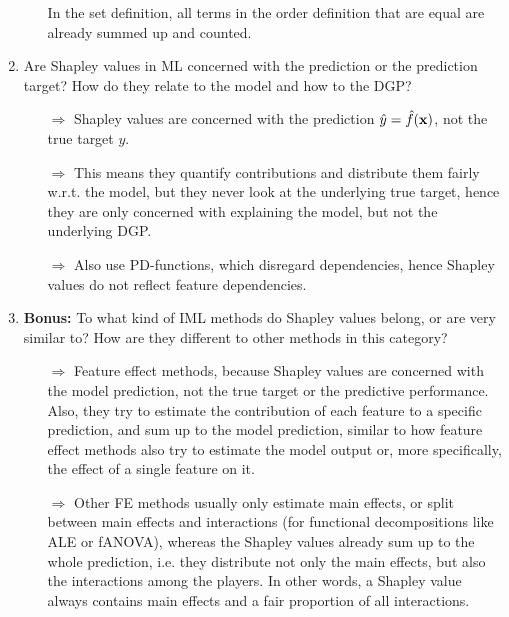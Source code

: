 \begin{enumerate}
\begin{itemize}
        In the set definition, all terms in the order definition that are equal are already summed up and counted.
	\end{itemize}
    \item Are Shapley values in ML concerned with the prediction or the prediction target? How do they relate to the model and how to the DGP?
	\begin{itemize}
		\item[$\Rightarrow$] Shapley values are concerned with the prediction $\hat{y} = \hat{f}(\mathbf{x})$, not the true target $y$.
		\item[$\Rightarrow$] This means they quantify contributions and distribute them fairly w.r.t. the model, but they never look at the underlying true target, hence they are only concerned with explaining the model, but not the underlying DGP.
		\item[$\Rightarrow$] Also use PD-functions, which disregard dependencies, hence Shapley values do not reflect feature dependencies.
	\end{itemize}
    \item \textbf{Bonus:} To what kind of IML methods do Shapley values belong, or are very similar to? How are they different to other methods in this category?
	\begin{itemize}
		\item[$\Rightarrow$] Feature effect methods, because Shapley values are concerned with the model prediction, not the true target or the predictive performance.
        Also, they try to estimate the contribution of each feature to a specific prediction, and sum up to the model prediction, similar to how feature effect methods also try to estimate the model output or, more specifically, the effect of a single feature on it.
		\item[$\Rightarrow$] Other FE methods usually only estimate main effects, or split between main effects and interactions (for functional decompositions like ALE or fANOVA), whereas the Shapley values already sum up to the whole prediction, i.e. they distribute not only the main effects, but also the interactions among the players.
        In other words, a Shapley value always contains main effects and a fair proportion of all interactions.
	\end{itemize}
\end{enumerate}
